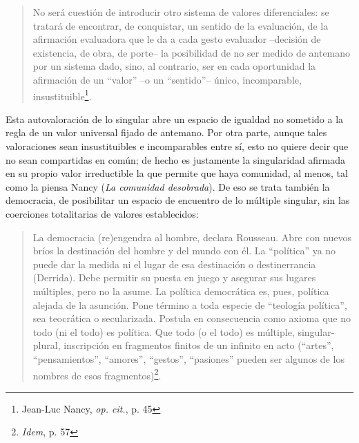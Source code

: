 \begin{quote}
No será cuestión de introducir otro sistema de valores diferenciales: se
tratará de encontrar, de conquistar, un sentido de la evaluación, de la
afirmación evaluadora que le da a cada gesto evaluador --decisión de
existencia, de obra, de porte-- la posibilidad de no ser medido de
antemano por un sistema dado, sino, al contrario, ser en cada
oportunidad la afirmación de un ``valor'' --o un ``sentido''-- único,
incomparable, insustituible\footnote{Jean-Luc Nancy, \emph{op. cit.}, p.
  45}.
\end{quote}

Esta autovaloración de lo singular abre un espacio de igualdad no
sometido a la regla de un valor universal fijado de antemano. Por otra
parte, aunque tales valoraciones sean insustituibles e incomparables
entre sí, esto no quiere decir que no sean compartidas en común; de
hecho es justamente la singularidad afirmada en su propio valor
irreductible la que permite que haya comunidad, al menos, tal como la
piensa Nancy (\emph{La comunidad desobrada}). De eso se trata también la
democracia, de posibilitar un espacio de encuentro de lo múltiple
singular, sin las coerciones totalitarias de valores establecidos:

\begin{quote}
La democracia (re)engendra al hombre, declara Rousseau. Abre con nuevos
bríos la destinación del hombre y del mundo con él. La ``política'' ya
no puede dar la medida ni el lugar de esa destinación o destinerrancia
(Derrida). Debe permitir su puesta en juego y asegurar sus lugares
múltiples, pero no la asume. La política democrática es, pues, política
alejada de la asunción. Pone término a toda especie de ``teología
política'', sea teocrática o secularizada. Postula en consecuencia como
axioma que no todo (ni el todo) es política. Que todo (o el todo) es
múltiple, singular-plural, inscripción en fragmentos finitos de un
infinito en acto (``artes'', ``pensamientos'', ``amores'', ``gestos'',
``pasiones'' pueden ser algunos de los nombres de esos
fragmentos)\footnote{\emph{Idem}, p. 57}.
\end{quote}

